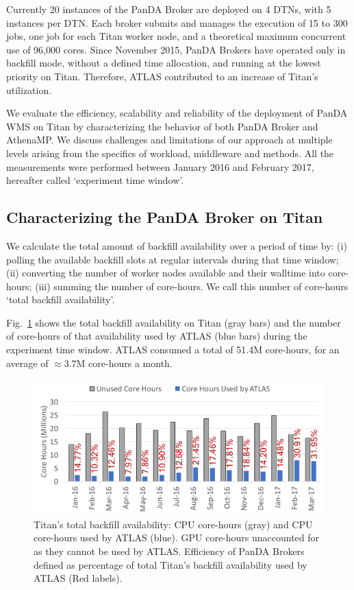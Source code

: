 Currently 20 instances of the PanDA Broker are deployed on 4 DTNs, with 5
instances per DTN\@. Each broker submits and manages the execution of 15 to
300 jobs, one job for each Titan worker node, and a theoretical maximum
concurrent use of 96,000 cores. Since November 2015, PanDA Brokers have
operated only in backfill mode, without a defined time allocation, and
running at the lowest priority on Titan. Therefore, ATLAS contributed to an
increase of Titan's utilization.

We evaluate the efficiency, scalability and reliability of the deployment of
PanDA WMS on Titan by characterizing the behavior of both PanDA Broker and
AthenaMP\@. We discuss challenges and limitations of our approach at multiple
levels arising from the specifics of workload, middleware and methods. All
the measurements were performed between January 2016 and February 2017,
hereafter called `experiment time window'.

\subsection{Characterizing the PanDA Broker on
Titan}\label{ssec:broker_titan}

We calculate the total amount of backfill availability over a period of time
by: (i) polling the available backfill slots at regular intervals during that
time window; (ii) converting the number of worker nodes available and their
walltime into core-hours; (iii) summing the number of core-hours. We call
this number of core-hours `total backfill availability'.

Fig.~\ref{fig:backfill-utilization} shows the total backfill availability on
Titan (gray bars) and the number of core-hours of that availability used by
ATLAS (blue bars) during the experiment time window. ATLAS consumed a total
of 51.4M core-hours, for an average of \(\approx\)3.7M core-hours a month.

\begin{figure}[!t]
    \includegraphics[clip,width=\columnwidth]{backfill_consumption.pdf}
    \vspace{-0.3in}
    \caption{Titan's total backfill availability: CPU core-hours (gray) and
    CPU core-hours used by ATLAS (blue). GPU core-hours unaccounted for as
    they cannot be used by ATLAS\@. Efficiency of PanDA Brokers defined as
    percentage of total Titan's backfill availability used by ATLAS (Red
    labels).}\label{fig:backfill-utilization}
\end{figure}

